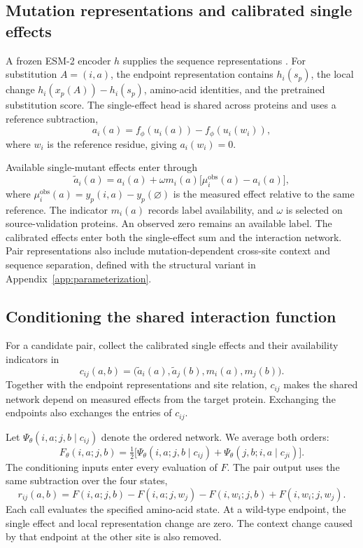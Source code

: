 \documentclass{llncs}
\begin{document}
\subsection{Mutation representations and calibrated single effects}

A frozen ESM-2 encoder $h$ supplies the sequence representations \citep{lin2023}. For substitution $A=(i,a)$, the endpoint representation contains $h_i(s_p)$, the local change $h_i(x_p(A))-h_i(s_p)$, amino-acid identities, and the pretrained substitution score. The single-effect head is shared across proteins and uses a reference subtraction,
\begin{equation}
a_i(a)=f_\phi(u_i(a))-f_\phi(u_i(w_i)),
\end{equation}
where $w_i$ is the reference residue, giving $a_i(w_i)=0$.

Available single-mutant effects enter through
\begin{equation}
\widetilde a_i(a)=a_i(a)+\omega m_i(a)\bigl[\mu_i^{\mathrm{obs}}(a)-a_i(a)\bigr],
\label{eq:calibration}
\end{equation}
where $\mu_i^{\mathrm{obs}}(a)=y_p(i,a)-y_p(\varnothing)$ is the measured effect relative to the same reference. The indicator $m_i(a)$ records label availability, and $\omega$ is selected on source-validation proteins. An observed zero remains an available label. The calibrated effects enter both the single-effect sum and the interaction network. Pair representations also include mutation-dependent cross-site context and sequence separation, defined with the structural variant in Appendix~\ref{app:parameterization}.

\subsection{Conditioning the shared interaction function}

For a candidate pair, collect the calibrated single effects and their availability indicators in
\begin{equation}
c_{ij}(a,b)=\bigl(\widetilde a_i(a),\widetilde a_j(b),m_i(a),m_j(b)\bigr).
\label{eq:conditioning}
\end{equation}
Together with the endpoint representations and site relation, $c_{ij}$ makes the shared network depend on measured effects from the target protein. Exchanging the endpoints also exchanges the entries of $c_{ij}$.

Let $\Psi_\theta(i,a;j,b\mid c_{ij})$ denote the ordered network. We average both orders:
\begin{equation}
F_\theta(i,a;j,b)=\tfrac12\bigl[\Psi_\theta(i,a;j,b\mid c_{ij})
+\Psi_\theta(j,b;i,a\mid c_{ji})\bigr].
\end{equation}
The conditioning inputs enter every evaluation of $F$. The pair output uses the same subtraction over the four states,
\begin{equation}
r_{ij}(a,b)=F(i,a;j,b)-F(i,a;j,w_j)-F(i,w_i;j,b)+F(i,w_i;j,w_j).
\label{eq:pair}
\end{equation}
Each call evaluates the specified amino-acid state. At a wild-type endpoint, the single effect and local representation change are zero. The context change caused by that endpoint at the other site is also removed.
\end{document}

